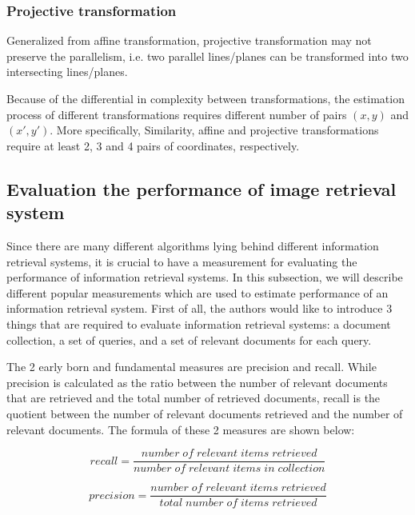 \subsubsection{Projective transformation} Generalized from affine transformation, projective transformation may not preserve the parallelism, i.e. two parallel lines/planes can be transformed into two intersecting lines/planes.

Because of the differential in complexity between transformations, the estimation process of different transformations requires different number of pairs $(x, y)$ and $(x', y')$. More specifically, Similarity, affine and projective transformations require at least 2, 3 and 4 pairs of coordinates, respectively.


\subsection{Evaluation the performance of image retrieval system} \label{section:evaluation_ir_sys}

Since there are many different algorithms lying behind different information retrieval systems, it is crucial to have a measurement for evaluating the performance of information retrieval systems. In this subsection, we will describe different popular measurements which are used to estimate performance of an information retrieval system. First of all, the authors would like to introduce 3 things that are required to evaluate information retrieval systems: a document collection, a set of queries, and a set of relevant documents for each query.

The 2 early born and fundamental measures are precision and recall. While precision is calculated as the ratio between the number of relevant documents that are retrieved and the total number of retrieved documents, recall is the quotient between the number of relevant documents retrieved and the number of relevant documents. The formula of these 2 measures are shown below:

\begin{equation}
recall = \frac{number\;of\;relevant\;items\;retrieved}{number\;of\;relevant\;items\;in\;collection}
\end{equation}

\begin{equation}
precision = \frac{number\;of\;relevant\;items\;retrieved}{total\;number\;of\;items\;retrieved}
\end{equation}

